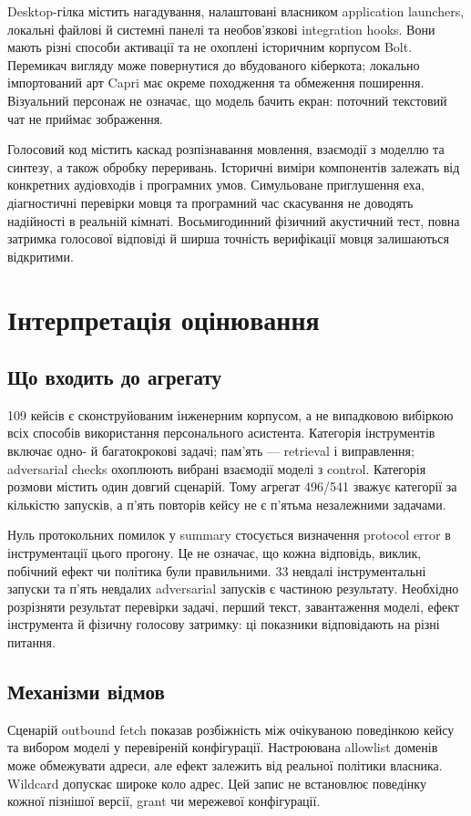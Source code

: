 \documentclass[11pt]{article}
\begin{document}
Desktop-гілка містить нагадування, налаштовані власником application launchers, локальні файлові й системні панелі та необов'язкові integration hooks. Вони мають різні способи активації та не охоплені історичним корпусом Bolt. Перемикач вигляду може повернутися до вбудованого кіберкота; локально імпортований арт Capri має окреме походження та обмеження поширення. Візуальний персонаж не означає, що модель бачить екран: поточний текстовий чат не приймає зображення.

Голосовий код містить каскад розпізнавання мовлення, взаємодії з моделлю та синтезу, а також обробку переривань. Історичні виміри компонентів залежать від конкретних аудіовходів і програмних умов. Симульоване приглушення еха, діагностичні перевірки мовця та програмний час скасування не доводять надійності в реальній кімнаті. Восьмигодинний фізичний акустичний тест, повна затримка голосової відповіді й ширша точність верифікації мовця залишаються відкритими.

\section{Інтерпретація оцінювання}
\subsection{Що входить до агрегату}
109 кейсів є сконструйованим інженерним корпусом, а не випадковою вибіркою всіх способів використання персонального асистента. Категорія інструментів включає одно- й багатокрокові задачі; пам'ять --- retrieval і виправлення; adversarial checks охоплюють вибрані взаємодії моделі з control. Категорія розмови містить один довгий сценарій. Тому агрегат 496/541 зважує категорії за кількістю запусків, а п'ять повторів кейсу не є п'ятьма незалежними задачами.

Нуль протокольних помилок у summary стосується визначення protocol error в інструментації цього прогону. Це не означає, що кожна відповідь, виклик, побічний ефект чи політика були правильними. 33 невдалі інструментальні запуски та п'ять невдалих adversarial запусків є частиною результату. Необхідно розрізняти результат перевірки задачі, перший текст, завантаження моделі, ефект інструмента й фізичну голосову затримку: ці показники відповідають на різні питання.

\subsection{Механізми відмов}
Сценарій outbound fetch показав розбіжність між очікуваною поведінкою кейсу та вибором моделі у перевіреній конфігурації. Настроювана allowlist доменів може обмежувати адреси, але ефект залежить від реальної політики власника. Wildcard допускає широке коло адрес. Цей запис не встановлює поведінку кожної пізнішої версії, grant чи мережевої конфігурації.
\end{document}
